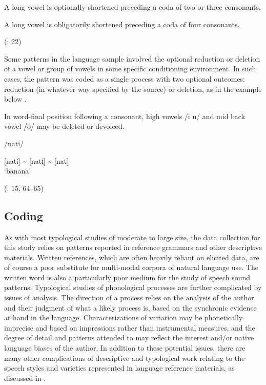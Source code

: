 \ea\label{ex:6.12}

\ea A long vowel is optionally shortened preceding a coda of two or three consonants.

\ex  A long vowel is obligatorily shortened preceding a coda of four consonants.

(\citealt{WieringWiering1994}: 22)
\z
\z

  Some patterns in the language sample involved the optional reduction or deletion of a vowel or group of vowels in some specific conditioning environment. In such cases, the pattern was coded as a single process with two optional outcomes: reduction (in whatever way specified by the source) or deletion, as in the  example below .

\ea\label{ex:6.13}

In word-final position following a consonant, high vowels /i u/ and mid back vowel /o/ may be deleted or devoiced.

/nati/

[nati] {\textasciitilde} [nati̥] {\textasciitilde} [nat]\\
\glt ‘banana’

(\citealt{Lacrampe2014}: 15, 64--65)
\z

\subsection{Coding}\label{sec:6.2.3}

  As with most typological studies of moderate to large size, the data collection for this study relies on patterns reported in reference grammars and other descriptive materials. Written references, which are often heavily reliant on elicited data, are of course a poor substitute for multi-modal corpora of natural language use. The written word is also a particularly poor medium for the study of speech sound patterns. Typological studies of phonological processes are further complicated by issues of analysis. The direction of a process relies on the analysis of the author and their judgment of what a likely process is, based on the synchronic evidence at hand in the language. Characterizations of variation may be phonetically imprecise and based on impressions rather than instrumental measures, and the degree of detail and patterns attended to may reflect the interest and/or native language biases of the author. In addition to these potential issues, there are many other complications of descriptive and typological work relating to the speech styles and varieties represented in language reference materials, as discussed in .

